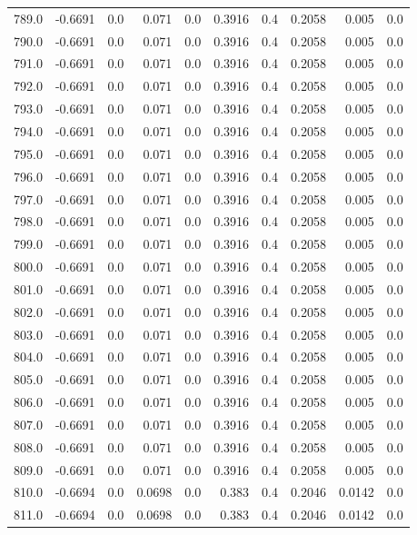 \begin{longtable}{lrrrrrrrrr}
789.0 & -0.6691 & 0.0 & 0.071 & 0.0 & 0.3916 & 0.4 & 0.2058 & 0.005 & 0.0 \\
790.0 & -0.6691 & 0.0 & 0.071 & 0.0 & 0.3916 & 0.4 & 0.2058 & 0.005 & 0.0 \\
791.0 & -0.6691 & 0.0 & 0.071 & 0.0 & 0.3916 & 0.4 & 0.2058 & 0.005 & 0.0 \\
792.0 & -0.6691 & 0.0 & 0.071 & 0.0 & 0.3916 & 0.4 & 0.2058 & 0.005 & 0.0 \\
793.0 & -0.6691 & 0.0 & 0.071 & 0.0 & 0.3916 & 0.4 & 0.2058 & 0.005 & 0.0 \\
794.0 & -0.6691 & 0.0 & 0.071 & 0.0 & 0.3916 & 0.4 & 0.2058 & 0.005 & 0.0 \\
795.0 & -0.6691 & 0.0 & 0.071 & 0.0 & 0.3916 & 0.4 & 0.2058 & 0.005 & 0.0 \\
796.0 & -0.6691 & 0.0 & 0.071 & 0.0 & 0.3916 & 0.4 & 0.2058 & 0.005 & 0.0 \\
797.0 & -0.6691 & 0.0 & 0.071 & 0.0 & 0.3916 & 0.4 & 0.2058 & 0.005 & 0.0 \\
798.0 & -0.6691 & 0.0 & 0.071 & 0.0 & 0.3916 & 0.4 & 0.2058 & 0.005 & 0.0 \\
799.0 & -0.6691 & 0.0 & 0.071 & 0.0 & 0.3916 & 0.4 & 0.2058 & 0.005 & 0.0 \\
800.0 & -0.6691 & 0.0 & 0.071 & 0.0 & 0.3916 & 0.4 & 0.2058 & 0.005 & 0.0 \\
801.0 & -0.6691 & 0.0 & 0.071 & 0.0 & 0.3916 & 0.4 & 0.2058 & 0.005 & 0.0 \\
802.0 & -0.6691 & 0.0 & 0.071 & 0.0 & 0.3916 & 0.4 & 0.2058 & 0.005 & 0.0 \\
803.0 & -0.6691 & 0.0 & 0.071 & 0.0 & 0.3916 & 0.4 & 0.2058 & 0.005 & 0.0 \\
804.0 & -0.6691 & 0.0 & 0.071 & 0.0 & 0.3916 & 0.4 & 0.2058 & 0.005 & 0.0 \\
805.0 & -0.6691 & 0.0 & 0.071 & 0.0 & 0.3916 & 0.4 & 0.2058 & 0.005 & 0.0 \\
806.0 & -0.6691 & 0.0 & 0.071 & 0.0 & 0.3916 & 0.4 & 0.2058 & 0.005 & 0.0 \\
807.0 & -0.6691 & 0.0 & 0.071 & 0.0 & 0.3916 & 0.4 & 0.2058 & 0.005 & 0.0 \\
808.0 & -0.6691 & 0.0 & 0.071 & 0.0 & 0.3916 & 0.4 & 0.2058 & 0.005 & 0.0 \\
809.0 & -0.6691 & 0.0 & 0.071 & 0.0 & 0.3916 & 0.4 & 0.2058 & 0.005 & 0.0 \\
810.0 & -0.6694 & 0.0 & 0.0698 & 0.0 & 0.383 & 0.4 & 0.2046 & 0.0142 & 0.0 \\
811.0 & -0.6694 & 0.0 & 0.0698 & 0.0 & 0.383 & 0.4 & 0.2046 & 0.0142 & 0.0 \\

\end{longtable}
